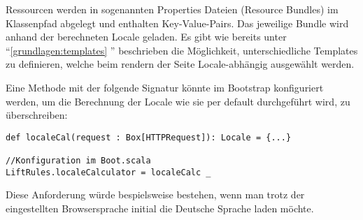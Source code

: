 Ressourcen werden in sogenannten Properties Dateien (Resource Bundles) im Klassenpfad abgelegt und enthalten Key-Value-Pairs. Das jeweilige Bundle wird anhand der berechneten Locale geladen. 
Es gibt wie bereits unter ``\ref{grundlagen:templates} '' beschrieben die M\"oglichkeit, unterschiedliche Templates zu definieren, welche beim rendern der Seite Locale-abh\"angig ausgew\"ahlt werden.

Eine Methode mit der folgende Signatur k\"onnte im Bootstrap konfiguriert werden, um die Berechnung der Locale wie sie per default durchgef\"uhrt wird, zu \"uberschreiben:

\begin{lstlisting}[caption=\"Uberschreibung der Locale-Berechnung]
def localeCal(request : Box[HTTPRequest]): Locale = {...}

//Konfiguration im Boot.scala
LiftRules.localeCalculator = localeCalc _
\end{lstlisting}


Diese Anforderung w\"urde bespielsweise bestehen, wenn man trotz der eingestellten Browsersprache initial die Deutsche Sprache laden m\"ochte.






